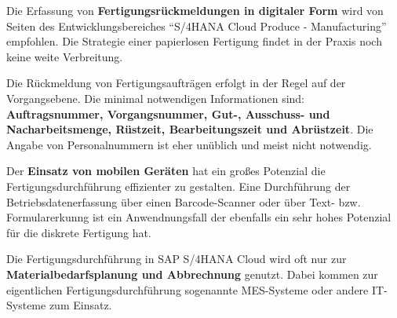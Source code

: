 \begin{definitionForm}[KA-T-2]
Die Erfassung von \textbf{Fertigungsrückmeldungen in digitaler Form} wird von Seiten des Entwicklungsbereiches \enquote{S/4HANA Cloud Produce - Manufacturing} empfohlen. Die Strategie einer papierlosen Fertigung findet in der Praxis noch keine weite Verbreitung.
\end{definitionForm}

\begin{definitionForm}[KA-T-3]
Die Rückmeldung von Fertigungsaufträgen erfolgt in der Regel auf der Vorgangsebene. Die minimal notwendigen Informationen sind: \textbf{Auftragsnummer, Vorgangsnummer, Gut-, Ausschuss- und Nacharbeitsmenge, Rüstzeit, Bearbeitungszeit und Abrüstzeit}. Die Angabe von Personalnummern ist eher unüblich und meist nicht notwendig.
\end{definitionForm}

\begin{definitionForm}[KA-T-4]
Der \textbf{Einsatz von mobilen Geräten} hat ein großes Potenzial die Fertigungsdurchführung effizienter zu gestalten. Eine Durchführung der Betriebsdatenerfassung über einen Barcode-Scanner oder über Text- bzw. Formularerkunng ist ein Anwendnungsfall der ebenfalls ein sehr hohes Potenzial für die diskrete Fertigung hat.
\end{definitionForm}

\begin{definitionForm}[KA-T-5]
Die Fertigungsdurchführung in SAP S/4HANA Cloud wird oft nur zur \textbf{Materialbedarfsplanung und Abbrechnung} genutzt. Dabei kommen zur eigentlichen Fertigungsdurchführung sogenannte MES-Systeme oder andere IT-Systeme zum Einsatz.
\end{definitionForm}

